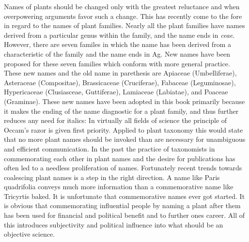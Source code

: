 Names of plants should be changed only with the greatest reluctance and when
overpowering arguments favor such a change. This has recently come to the fore in
regard to the names of plant families. Nearly all the plant families have names derived
from a particular genus within the family, and the name ends in \textit{ceae}. However, there
are seven familes in which the name has been derived from a characteristic of the
family and the name ends in Ag. New names have been proposed for these seven
families which conform with more general practice. These new names and the old
name in parethesis are Apiaceae (Umbelliferae), Asteraceae (Compositae),
Brassicaceae (Cruciferae), Fabaceae (Leguminosae), Hypericaceae (Clusiasceae,
Guttiferae), Lamiaceae (Labiatae), and Poaceae (Graminae). These new names have
been adopted in this book primarily because it makes the ending of the name
diagnostic for a plant family, and thus further reduces any need for italics:
In virtually all fields of science the principle of Occam's razor is given first
priority. Applied to plant taxonomy this would state that no more plant names should
be invoked than are necessary for unambiguous and efficient communication. In the
past the practice of taxonomists in commemorating each other in plant names and the
desire for publications has often led to a needless proliferation of names. Fortunately
recent trends towards coalescing plant names is a step in the right direction. A name
like Paris quadrifolia conveys much more information than a commemorative name
like Tricyrtis baked. It is unfortunate that commemorative names ever got started. It is
obvious that commemorating influential people by naming a plant after them has been
used for financial and political benefit and to further ones career. All of this introduces
subjectivity and political influence into what should be an objective science.

